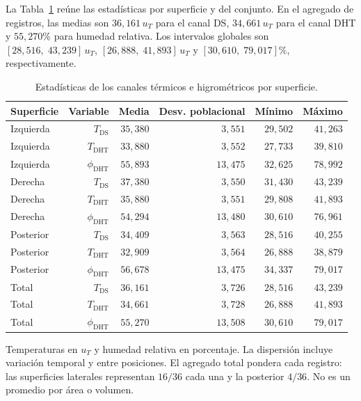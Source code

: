 La Tabla~\ref{tab:res_descriptivos} reúne las estadísticas por superficie y del conjunto. En el agregado de registros, las medias son $36{,}161\,u_T$ para el canal DS, $34{,}661\,u_T$ para el canal DHT y $55{,}270\%$ para humedad relativa. Los intervalos globales son $[28{,}516,\;43{,}239]\,u_T$, $[26{,}888,\;41{,}893]\,u_T$ y $[30{,}610,\;79{,}017]\%$, respectivamente.

\begin{table}[htbp]
\centering
\caption{Estadísticas de los canales térmicos e higrométricos por superficie.}
\label{tab:res_descriptivos}
\small
\setlength{\tabcolsep}{5pt}
\begin{tabular}{lrrrrr}
\toprule
Superficie & Variable & Media & Desv. poblacional & Mínimo & Máximo \\
\midrule
Izquierda & $T_{\mathrm{DS}}$ & $35{,}380$ & $3{,}551$ & $29{,}502$ & $41{,}263$ \\
Izquierda & $T_{\mathrm{DHT}}$ & $33{,}880$ & $3{,}552$ & $27{,}733$ & $39{,}810$ \\
Izquierda & $\phi_{\mathrm{DHT}}$ & $55{,}893$ & $13{,}475$ & $32{,}625$ & $78{,}992$ \\
Derecha & $T_{\mathrm{DS}}$ & $37{,}380$ & $3{,}550$ & $31{,}430$ & $43{,}239$ \\
Derecha & $T_{\mathrm{DHT}}$ & $35{,}880$ & $3{,}551$ & $29{,}808$ & $41{,}893$ \\
Derecha & $\phi_{\mathrm{DHT}}$ & $54{,}294$ & $13{,}480$ & $30{,}610$ & $76{,}961$ \\
Posterior & $T_{\mathrm{DS}}$ & $34{,}409$ & $3{,}563$ & $28{,}516$ & $40{,}255$ \\
Posterior & $T_{\mathrm{DHT}}$ & $32{,}909$ & $3{,}564$ & $26{,}888$ & $38{,}879$ \\
Posterior & $\phi_{\mathrm{DHT}}$ & $56{,}678$ & $13{,}475$ & $34{,}337$ & $79{,}017$ \\
Total & $T_{\mathrm{DS}}$ & $36{,}161$ & $3{,}726$ & $28{,}516$ & $43{,}239$ \\
Total & $T_{\mathrm{DHT}}$ & $34{,}661$ & $3{,}728$ & $26{,}888$ & $41{,}893$ \\
Total & $\phi_{\mathrm{DHT}}$ & $55{,}270$ & $13{,}508$ & $30{,}610$ & $79{,}017$ \\
\bottomrule
\end{tabular}
\par\vspace{3pt}
\begin{minipage}{0.98\textwidth}\footnotesize
Temperaturas en $u_T$ y humedad relativa en porcentaje. La dispersión incluye variación temporal y entre posiciones. El agregado total pondera cada registro: las superficies laterales representan $16/36$ cada una y la posterior $4/36$. No es un promedio por área o volumen.
\end{minipage}
\end{table}


